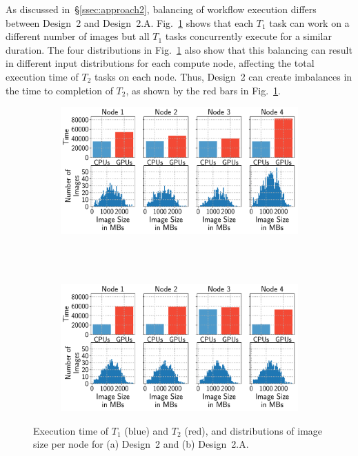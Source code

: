 As discussed in~\S\ref{ssec:approach2}, balancing of workflow execution differs between Design~2 and Design~2.A. Fig.~\ref{fig:design2_timeline} shows that each $T_{1}$ task can work on a different number of images but all $T_{1}$ tasks concurrently execute for a similar duration.
The four distributions in Fig.~\ref{fig:design2_timeline} also show that this balancing can result in different input distributions for each compute node, affecting the total execution time of $T_{2}$ tasks on each node.
Thus, Design~2 can create imbalances in the time to completion of $T_{2}$, as shown by the red bars in Fig.~\ref{fig:design2_timeline}.

\begin{figure}[H]
    \centering
    \begin{subfigure}[b]{0.75\textwidth}
        \includegraphics[width=\linewidth]{figures/designs/design2_timelines.pdf}
        \caption{}
        \label{fig:design2_timeline}
    \end{subfigure}\\
    ~ 
    \begin{subfigure}[b]{0.75\textwidth}
        \includegraphics[width=\linewidth]{figures/designs/design2a_timelines.pdf}
        \caption{}
        \label{fig:design2a_timeline}
    \end{subfigure}
    \caption{Execution time of $T_{1}$ (blue) and $T_{2}$ (red),
        and distributions of image size per node for (a) Design~2 and (b)
        Design~2.A.}
    \label{fig:design_balancing}
\end{figure}



